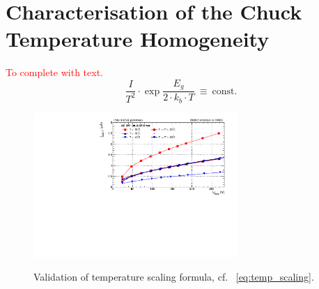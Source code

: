 \section{Characterisation of the Chuck Temperature Homogeneity}
\label{appendix:chuck_temp}
\textcolor{red}{To complete with text.}
\begin{equation}
    \label{eq:temp_scaling}
    \frac{I}{T^2}\cdot \exp{\frac{E_g}{2\cdot k_b \cdot T}}~\equiv~\text{const.}
\end{equation}

\begin{figure}[h]
	\centering
	\includegraphics[width=0.69\textwidth]{plots/iv_temp_scaling/iv_overlay_ch24.pdf}
	\label{plot:iv_tempscaling}
	\caption{
	    Validation of temperature scaling formula, cf. ~\ref{eq:temp_scaling}.
	}
\end{figure}

